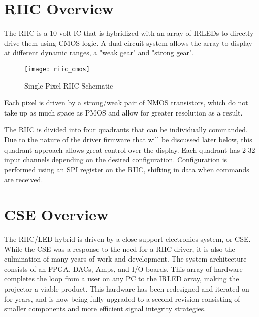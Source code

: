 \section{RIIC Overview}
The RIIC is a 10 volt IC that is hybridized with an array of IRLEDs to directly drive them using CMOS logic. A dual-circuit system allows the array to display at different dynamic ranges, a "weak gear" and "strong gear". 
\begin {figure} [h]
\texttt{[image: riic\_cmos]}
\centering
\caption {Single Pixel RIIC Schematic}
\centering
\end {figure}
Each pixel is driven by a strong/weak pair of NMOS transistors, which do not take up as much space as PMOS and allow for greater resolution as a result. \par
The RIIC is divided into four quadrants that can be individually commanded. Due to the nature of the driver firmware that will be discussed later below, this quadrant approach allows great control over the display. \cite{miguel} Each quadrant has 2-32 input channels depending on the desired configuration. Configuration is performed using an SPI register on the RIIC, shifting in data when commands are received. \par

\section{CSE Overview}
The RIIC/LED hybrid is driven by a close-support electronics system, or CSE. While the CSE was a response to the need for a RIIC driver, it is also the culmination of many years of work and development. The system architecture consists of an FPGA, DACs, Amps, and I/O boards. This array of hardware completes the loop from a user on any PC to the IRLED array, making the projector a viable product. This hardware has been redesigned and iterated on for years, and is now being fully upgraded to a second revision consisting of smaller components and more efficient signal integrity strategies.


